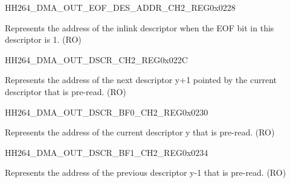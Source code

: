     
    \begin{register}{H}{H264\_DMA\_OUT\_EOF\_DES\_ADDR\_CH2\_REG}{0x0228}\label{regdesc:H264DMAOUTEOFDESADDRCH2REG}
    \regnewline%
    \begin{regdesc}\begin{reglist}
    \label{fielddesc:H264DMAOUTEOFDESADDRCH2}\item [H264\_DMA\_OUT\_EOF\_DES\_ADDR\_CH2] Represents the address of the inlink descriptor when the EOF bit in this descriptor is 1. (RO)
    \end{reglist}\end{regdesc}
    \end{register}
    
    
    \begin{register}{H}{H264\_DMA\_OUT\_DSCR\_CH2\_REG}{0x022C}\label{regdesc:H264DMAOUTDSCRCH2REG}
    \regnewline%
    \begin{regdesc}\begin{reglist}
    \label{fielddesc:H264DMAOUTLINKDSCRCH2}\item [H264\_DMA\_OUTLINK\_DSCR\_CH2] Represents the address of the next descriptor y+1 pointed by the current descriptor that is pre-read. (RO)
    \end{reglist}\end{regdesc}
    \end{register}
    
    
    \begin{register}{H}{H264\_DMA\_OUT\_DSCR\_BF0\_CH2\_REG}{0x0230}\label{regdesc:H264DMAOUTDSCRBF0CH2REG}
    \regnewline%
    \begin{regdesc}\begin{reglist}
    \label{fielddesc:H264DMAOUTLINKDSCRBF0CH2}\item [H264\_DMA\_OUTLINK\_DSCR\_BF0\_CH2] Represents the address of the current descriptor y that is pre-read. (RO)
    \end{reglist}\end{regdesc}
    \end{register}
    
    
    \begin{register}{H}{H264\_DMA\_OUT\_DSCR\_BF1\_CH2\_REG}{0x0234}\label{regdesc:H264DMAOUTDSCRBF1CH2REG}
    \regnewline%
    \begin{regdesc}\begin{reglist}
    \label{fielddesc:H264DMAOUTLINKDSCRBF1CH2}\item [H264\_DMA\_OUTLINK\_DSCR\_BF1\_CH2] Represents the address of the previous descriptor y-1 that is pre-read. (RO)
    \end{reglist}\end{regdesc}
    \end{register}
    
